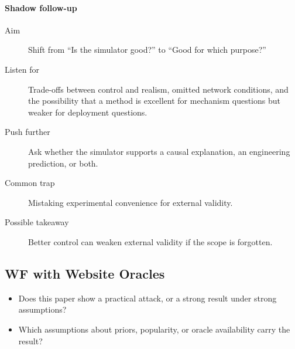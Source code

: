 \paragraph{Shadow follow-up}
\begin{description}
  \item[Aim] Shift from \enquote{Is the simulator good?} to \enquote{Good for
    which purpose?}
  \item[Listen for] Trade-offs between control and realism, omitted network
    conditions, and the possibility that a method is excellent for mechanism
    questions but weaker for deployment questions.
  \item[Push further] Ask whether the simulator supports a causal explanation,
    an engineering prediction, or both.
  \item[Common trap] Mistaking experimental convenience for external validity.
  \item[Possible takeaway] Better control can weaken external validity if the
    scope is forgotten.
\end{description}

\subsection{WF with Website Oracles}

\begin{frame}
  \begin{question}
    \begin{itemize}
      \item Does this paper show a practical attack, or a strong result under
        strong assumptions?
      \item Which assumptions about priors, popularity, or oracle availability
        carry the result?
    \end{itemize}
  \end{question}
\end{frame}

